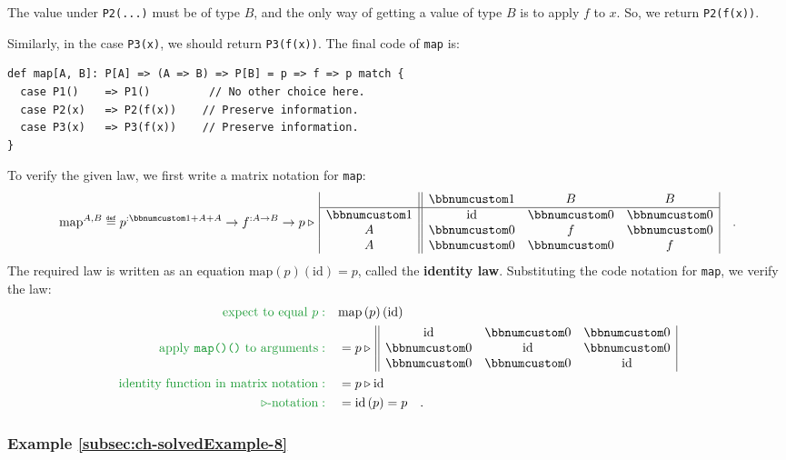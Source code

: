 The value under \lstinline!P2(...)! must be of type $B$, and the
only way of getting a value of type $B$ is to apply $f$ to $x$.
So, we return \lstinline!P2(f(x))!.

Similarly, in the case \lstinline!P3(x)!, we should return \lstinline!P3(f(x))!.
The final code of \lstinline!map! is:
\begin{lstlisting}
def map[A, B]: P[A] => (A => B) => P[B] = p => f => p match {
  case P1()    => P1()         // No other choice here.
  case P2(x)   => P2(f(x))    // Preserve information.
  case P3(x)   => P3(f(x))    // Preserve information.
}
\end{lstlisting}

To verify the given law, we first write a matrix notation for \lstinline!map!:
\[
\text{map}^{A,B}\triangleq p^{:\bbnum 1+A+A}\rightarrow f^{:A\rightarrow B}\rightarrow p\triangleright\,\begin{array}{|c||ccc|}
 & \bbnum 1 & B & B\\
\hline \bbnum 1 & \text{id} & \bbnum 0 & \bbnum 0\\
A & \bbnum 0 & f & \bbnum 0\\
A & \bbnum 0 & \bbnum 0 & f
\end{array}\quad.
\]
The required law is written as an equation $\text{map}\left(p\right)(\text{id})=p$,
called the \textbf{identity
law}. Substituting the code notation for \lstinline!map!, we verify
the law:
\begin{align*}
{\color{greenunder}\text{expect to equal }p:}\quad & \text{map}\left(p\right)(\text{id})\\
{\color{greenunder}\text{apply \texttt{map()()} to arguments}:}\quad & =p\triangleright\,\begin{array}{||ccc|}
\text{id} & \bbnum 0 & \bbnum 0\\
\bbnum 0 & \text{id} & \bbnum 0\\
\bbnum 0 & \bbnum 0 & \text{id}
\end{array}\\
{\color{greenunder}\text{identity function in matrix notation}:}\quad & =p\triangleright\text{id}\\
{\color{greenunder}\triangleright\text{-notation}:}\quad & =\text{id}\left(p\right)=p\quad.
\end{align*}


\subsubsection{Example \label{subsec:ch-solvedExample-8}\ref{subsec:ch-solvedExample-8}}

